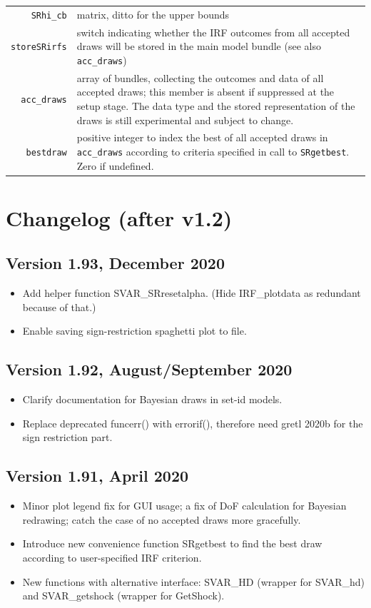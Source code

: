 \documentclass[a4paper,10pt]{article}
\begin{document}
\begin{tabular}{rp{}}
  \texttt{SRhi\_cb} & matrix, ditto for the upper bounds\\
  
   \texttt{storeSRirfs} & switch indicating whether the IRF outcomes from all accepted draws
     will be stored in the main model bundle (see also \texttt{acc\_draws})\\
   \texttt{acc\_draws} & array of bundles, collecting the outcomes and data of all accepted 
   draws; this member is absent if suppressed at the setup stage. The data type and the 
   stored representation of the draws is still experimental and subject to change.\\
   
   \texttt{bestdraw} & positive integer to index the best of all accepted draws in \texttt{acc\_draws} 
   according to criteria specified in call to \texttt{SRgetbest}. Zero if undefined. 
  \end{tabular}
  
\section{Changelog (after v1.2)}
\label{sec:changelog}

\subsection*{Version 1.93, December 2020}
\begin{itemize}
\item Add helper function SVAR\_SRresetalpha. (Hide IRF\_plotdata as 
 redundant because of that.)
 \item Enable saving sign-restriction spaghetti plot to file.
\end{itemize}

\subsection*{Version 1.92, August/September 2020}
\begin{itemize}
\item Clarify documentation for Bayesian draws in set-id models.
\item Replace deprecated funcerr() with errorif(), therefore need gretl 2020b for the sign restriction part. 
\end{itemize}

\subsection*{Version 1.91, April 2020}
\begin{itemize}
\item Minor plot legend fix for GUI usage; a fix of DoF calculation for Bayesian redrawing;
catch the case of no accepted draws more gracefully.
\item Introduce new convenience function SRgetbest to find the best draw according to 
user-specified IRF criterion.
\item New functions with alternative interface: SVAR\_HD (wrapper for SVAR\_hd) and 
SVAR\_getshock (wrapper for GetShock).
\end{itemize}
\end{document}
